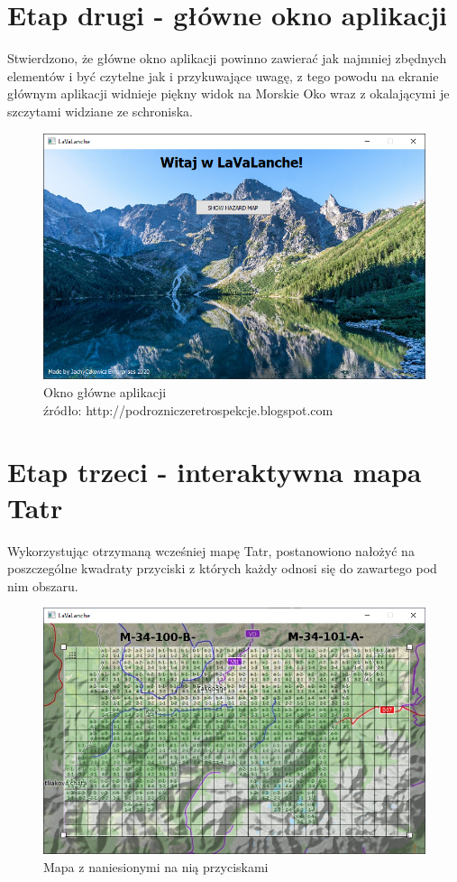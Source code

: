 \section{Etap drugi - główne okno aplikacji}
Stwierdzono, że główne okno aplikacji powinno zawierać jak najmniej zbędnych elementów i być czytelne jak i przykuwające uwagę, z tego powodu na ekranie głównym aplikacji widnieje piękny widok na Morskie Oko wraz z okalającymi je szczytami widziane ze schroniska.
\begingroup
\begin{figure}[h]
	\centering
	\includegraphics[scale=0.6]{main_window.png}
	\caption{Okno główne aplikacji \\ źródło: http://podrozniczeretrospekcje.blogspot.com}
\end{figure}
\endgroup
\clearpage
\section{Etap trzeci - interaktywna mapa Tatr}
Wykorzystując otrzymaną wcześniej mapę Tatr, postanowiono nałożyć na poszczególne kwadraty przyciski z których każdy odnosi się do zawartego pod nim obszaru. 

\begingroup
\begin{figure}[h]
	\centering
	\includegraphics[scale=0.6]{map_window.png}
	\caption{Mapa z naniesionymi na nią przyciskami}
\end{figure}
\endgroup

